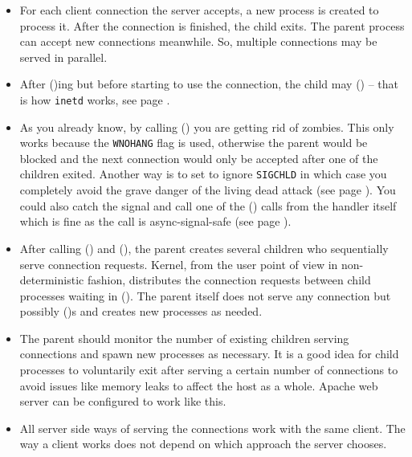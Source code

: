 
\begin{slide}

\end{slide}

\begin{itemize}
\item For each client connection the server accepts, a new process is created to
process it.  After the connection is finished, the child exits.  The parent
process can accept new connections meanwhile.  So, multiple connections may be
served in parallel.
\item After ()ing but before starting to use the connection, the
child may () -- that is how \texttt{inetd} works, see page
\pageref{INETD}.
\item As you already know, by calling () you are getting rid of
zombies. This only works because the \texttt{WNOHANG} flag is used,
otherwise the parent would be blocked and the next connection would only be
accepted after one of the children exited.
Another way is to set to ignore \texttt{SIGCHLD} in which case you
completely avoid the grave danger of the living dead attack (see page
\pageref{IGNORE_SIG_CHLD}).  You could also catch the signal and call
one of the () calls from the handler itself which is fine as the
call is async-signal-safe (see page \pageref{ASYNCSIGNALSAFE}).
\end{itemize}


\begin{slide}

\end{slide}

\begin{itemize}
\item After calling () and (), the parent creates
several children who sequentially serve connection requests.  Kernel,
from the user point of view in non-deterministic fashion, distributes the
connection requests between child processes waiting in ().
The parent itself does not serve any connection but possibly ()s and
creates new processes as needed.
\item The parent should monitor the number of existing children serving
connections and spawn new processes as necessary.
It is a good idea for child processes to voluntarily exit after serving a
certain number of connections to avoid issues like memory leaks to affect the
host as a whole. Apache web server can be configured to work like this.
\item All server side ways of serving the connections work with the same client.
The way a client works does not depend on which approach the server chooses.
\end{itemize}


